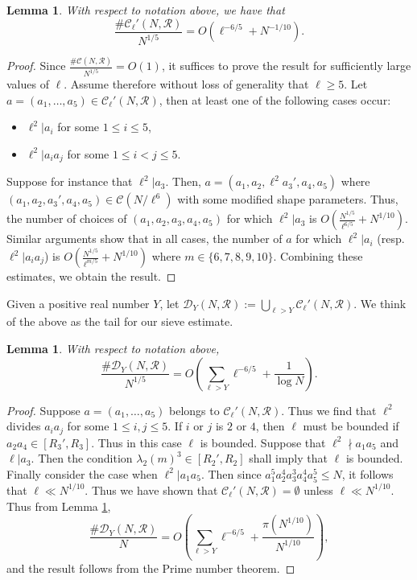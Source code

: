 \documentclass[table]{amsart}
\newtheorem{lemma}[theorem]{Lemma}
\numberwithin{equation}{section}
\begin{document}
\begin{lemma}\label{Rellprime lemma} With respect to notation above, we have that
    \[\frac{\#\mathcal{C}_\ell'(N,\mathscr{R})}{N^{1/5}}=O\left(\ell^{-6/5}+N^{-1/10}\right).\]
\end{lemma}
\begin{proof}
Since $\frac{\#\mathcal{C}(N,\mathscr{R})}{N^{1/5}}=O(1)$, it suffices to prove the result for sufficiently large values of $\ell$. Assume therefore without loss of generality that $\ell\geq 5$. Let $a=(a_1, \dots, a_5)\in \mathcal{C}_\ell'(N,\mathscr{R})$, then at least one of the following cases occur:
\begin{itemize}
    \item $\ell^2|a_i$ for some $1\leq i\leq 5$,
    \item $\ell^2|a_ia_j$ for some $1\leq i<j\leq 5$.
\end{itemize}
Suppose for instance that $\ell^2|a_3$. Then, $a=(a_1,a_2,\ell^2a_3', a_4, a_5)$ where $(a_1, a_2,a_3', a_4, a_5)\in \mathcal{C}(N/\ell^6)$ with some modified shape parameters. Thus, the number of choices of $(a_1, a_2,a_3, a_4, a_5)$ for which $\ell^2|a_3$ is $O\left(\frac{N^{1/5}}{\ell^{6/5}}+{N^{1/10}}\right)$. Similar arguments show that in all cases, the number of $a$ for which $\ell^2|a_i$ (resp. $\ell^2|a_ia_j$) is $O\left(\frac{N^{1/5}}{\ell^{m/5}}+{N^{1/10}}\right)$ where $m\in \{6,7,8,9,10\}$. Combining these estimates, we obtain the result.
\end{proof}
\noindent Given a positive real number $Y$, let $\mathcal{D}_Y(N,\mathscr{R}):=\bigcup_{\ell>Y} \mathcal{C}_\ell'(N,\mathscr{R})$. We think of the above as the tail for our sieve estimate. \begin{lemma}\label{tail estimate}
    With respect to notation above, 
    \[\frac{\#\mathcal{D}_Y(N,\mathscr{R}) }{N^{1/5}}=O\left(\sum_{\ell>Y} \ell^{-6/5}+\frac{1}{\log N}\right).\]
\end{lemma}
\begin{proof}
    Suppose $a=(a_1, \dots, a_5)$ belongs to $\mathcal{C}_\ell'(N,\mathscr{R})$. Thus we find that $\ell^2$ divides $a_ia_j$ for some $1\leq i, j\leq 5$. If $i$ or $j$ is $2$ or $4$, then $\ell$ must be bounded if $a_2a_4\in [R_3', R_3]$. Thus in this case $\ell$ is bounded. Suppose that $\ell^2\nmid a_1a_5$ and $\ell|a_3$. Then the condition $\lambda_2(m)^3\in [R_2',R_2]$ shall imply that $\ell$ is bounded. Finally consider the case when $\ell^2|a_1a_5$. Then since $a_1^5a_2^4a_3^3a_4^4a_5^5\leq N$, it follows that $\ell\ll N^{1/10}$. Thus we have shown that  $\mathcal{C}_\ell'(N,\mathscr{R})=\emptyset$ unless $\ell\ll N^{1/10}$. Thus from Lemma \ref{Rellprime lemma},
     \[\frac{\# \mathcal{D}_Y(N,\mathscr{R})}{N}=O\left(\sum_{\ell>Y} \ell^{-6/5}+ \frac{\pi(N^{1/10})}{N^{1/10}}\right),\]
    and the result follows from the Prime number theorem.
\end{proof}
\end{document}
